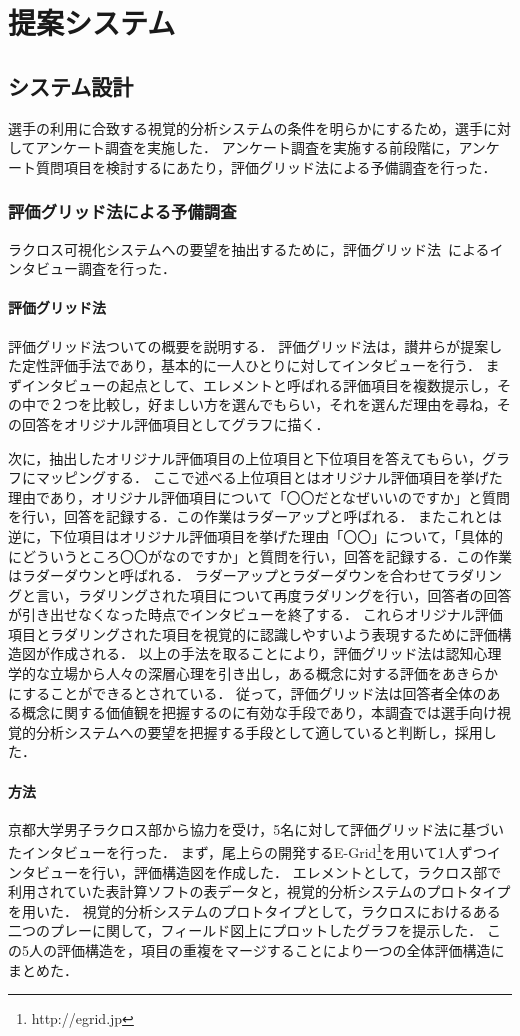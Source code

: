 \documentclass[sotsuron]{kuee}
\begin{document}
\chapter{提案システム}
	\section{システム設計}
		選手の利用に合致する視覚的分析システムの条件を明らかにするため，選手に対してアンケート調査を実施した．
		アンケート調査を実施する前段階に，アンケート質問項目を検討するにあたり，評価グリッド法による予備調査を行った．
		\subsection{評価グリッド法による予備調査}
			ラクロス可視化システムへの要望を抽出するために，評価グリッド法~\cite{EGM}によるインタビュー調査を行った．
			\subsubsection{評価グリッド法}
				評価グリッド法ついての概要を説明する．
				評価グリッド法は，讃井らが提案した定性評価手法であり，基本的に一人ひとりに対してインタビューを行う．
				まずインタビューの起点として、エレメントと呼ばれる評価項目を複数提示し，その中で２つを比較し，好ましい方を選んでもらい，それを選んだ理由を尋ね，その回答をオリジナル評価項目としてグラフに描く．

				次に，抽出したオリジナル評価項目の上位項目と下位項目を答えてもらい，グラフにマッピングする．
				ここで述べる上位項目とはオリジナル評価項目を挙げた理由であり，オリジナル評価項目について「〇〇だとなぜいいのですか」と質問を行い，回答を記録する．この作業はラダーアップと呼ばれる．
				またこれとは逆に，下位項目はオリジナル評価項目を挙げた理由「〇〇」について，「具体的にどういうところ〇〇がなのですか」と質問を行い，回答を記録する．この作業はラダーダウンと呼ばれる．
				ラダーアップとラダーダウンを合わせてラダリングと言い，ラダリングされた項目について再度ラダリングを行い，回答者の回答が引き出せなくなった時点でインタビューを終了する．
				これらオリジナル評価項目とラダリングされた項目を視覚的に認識しやすいよう表現するために評価構造図が作成される．
				以上の手法を取ることにより，評価グリッド法は認知心理学的な立場から人々の深層心理を引き出し，ある概念に対する評価をあきらかにすることができるとされている．
				従って，評価グリッド法は回答者全体のある概念に関する価値観を把握するのに有効な手段であり，本調査では選手向け視覚的分析システムへの要望を把握する手段として適していると判断し，採用した．
			\subsubsection{方法}
				京都大学男子ラクロス部から協力を受け，5名に対して評価グリッド法に基づいたインタビューを行った．
				まず，尾上らの開発するE-Grid\footnote{http://egrid.jp}を用いて1人ずつインタビューを行い，評価構造図を作成した．
				エレメントとして，ラクロス部で利用されていた表計算ソフトの表データと，視覚的分析システムのプロトタイプを用いた．
				視覚的分析システムのプロトタイプとして，ラクロスにおけるある二つのプレーに関して，フィールド図上にプロットしたグラフを提示した．
				この5人の評価構造を，項目の重複をマージすることにより一つの全体評価構造にまとめた．
\end{document}
